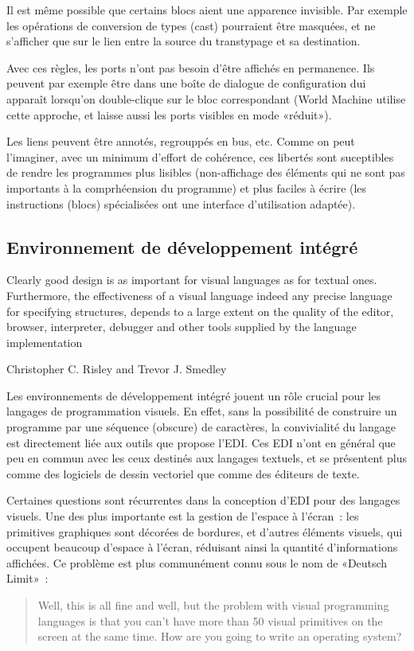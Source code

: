 \documentclass{article}
\begin{document}
Il est même possible que certains blocs aient une apparence invisible. Par exemple les opérations de conversion de types (cast) pourraient
être masquées, et ne s'afficher que sur le lien entre la source du transtypage et sa destination.

Avec ces règles, les ports n'ont pas besoin d'être affichés en permanence. Ils peuvent par exemple être dans une boîte de dialogue de
configuration dui apparaît lorsqu'on double-clique sur le bloc correspondant (World Machine utilise cette approche, et laisse aussi les
ports visibles en mode «réduit»).

Les liens peuvent être annotés, regrouppés en bus, etc. Comme on peut l'imaginer, avec un minimum d'effort de cohérence, ces libertés sont
suceptibles de rendre les programmes plus lisibles (non-affichage des éléments qui ne sont pas importants à la comprhéension du programme)
et plus faciles à écrire (les instructions (blocs) spécialisées ont une interface d'utilisation adaptée).

\subsection{Environnement de développement intégré}

{
  \setlength{\epigraphwidth}{0.85\linewidth}
  \renewcommand{\textflush}{justify}
  \renewcommand{\epigraphflush}{center}
  \epigraph{
    Clearly good design is as important for visual languages as for textual ones. Furthermore, the effectiveness of a visual language indeed
    any precise language for specifying structures, depends to a large extent on the quality of the editor, browser, interpreter, debugger and
    other tools supplied by the language implementation
  }{Christopher C. Risley and Trevor J. Smedley \cite{the-editor-is-as-important-as-the-language}}
}

Les environnements de développement intégré jouent un rôle crucial pour les langages de programmation visuels. En effet, sans la possibilité
de construire un programme par une séquence (obscure) de caractères, la convivialité du langage est directement liée aux outils que propose
l'EDI. Ces EDI n'ont en général que peu en commun avec les ceux destinés aux langages textuels, et se présentent plus comme des logiciels de
dessin vectoriel que comme des éditeurs de texte.

Certaines questions sont récurrentes dans la conception d'EDI pour des langages visuels. Une des plus importante est la gestion de l'espace
à l'écran~: les primitives graphiques sont décorées de bordures, et d'autres éléments visuels, qui occupent beaucoup d'espace à l'écran,
réduisant ainsi la quantité d'informations affichées. Ce problème est plus communément connu sous le nom de «Deutsch
Limit»\cite{deutsch-limit}~:
\begin{quotation}
  Well, this is all fine and well, but the problem with visual programming languages is that you can’t have more than 50 visual primitives
  on the screen at the same time. How are you going to write an operating system?
\end{quotation}
\end{document}
